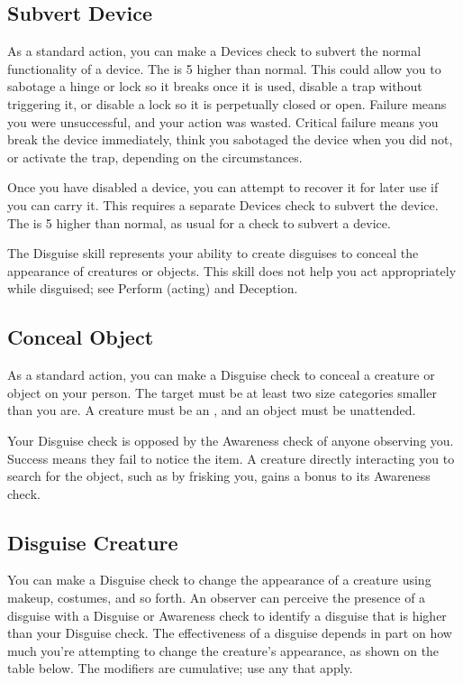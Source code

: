     \subsection{Subvert Device}
        As a standard action, you can make a Devices check to subvert the normal functionality of a device. The  is 5 higher than normal. This could allow you to sabotage a hinge or lock so it breaks once it is used, disable a trap without triggering it, or disable a lock so it is perpetually closed or open. Failure means you were unsuccessful, and your action was wasted. Critical failure means you break the device immediately, think you sabotaged the device when you did not, or activate the trap, depending on the circumstances.

        Once you have disabled a device, you can attempt to recover it for later use if you can carry it. This requires a separate Devices check to subvert the device. The  is 5 higher than normal, as usual for a check to subvert a device.

\newpage
{}
        The Disguise skill represents your ability to create disguises to conceal the appearance of creatures or objects. This skill does not help you act appropriately while disguised; see Perform (acting) and Deception.

    \subsection{Conceal Object}
        As a standard action, you can make a Disguise check to conceal a creature or object on your person.
        The target must be at least two size categories smaller than you are.
        A creature must be an , and an object must be unattended.

        Your Disguise check is opposed by the Awareness check of anyone observing you.
        Success means they fail to notice the item. A creature directly interacting you to search for the object, such as by frisking you, gains a  bonus to its Awareness check.

    \subsection{Disguise Creature}\label{Disguise Creature}
        You can make a Disguise check to change the appearance of a creature using makeup, costumes, and so forth. An observer can perceive the presence of a disguise with a Disguise or Awareness check to identify a disguise that is higher than your Disguise check. The effectiveness of a disguise depends in part on how much you're attempting to change the creature's appearance, as shown on the table below. The modifiers are cumulative; use any that apply.

